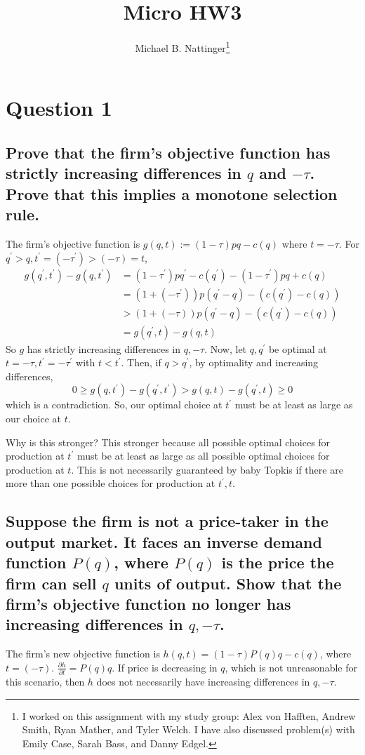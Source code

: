 \documentclass[11pt]{article} %
\title{Micro HW3}
\author{Michael B. Nattinger\footnote{I worked on this assignment with my study group: Alex von Hafften, Andrew Smith, Ryan Mather, and Tyler Welch. I have also discussed problem(s) with Emily Case, Sarah Bass, and Danny Edgel.}}
\begin{document}
\maketitle

\section{Question 1}
\subsection{Prove that the firm's objective function has strictly increasing differences in $q$ and $-\tau$. Prove that this implies a monotone selection rule.}
The firm's objective function is $g(q,t):= (1-\tau)pq - c(q)$ where $t = -\tau$. For $q^{'}>q,t^{'} = (-\tau^{'})>(-\tau) = t$,
\begin{align*}
g(q^{'},t^{'}) - g(q,t^{'}) &=  (1-\tau^{'})pq^{'} - c(q^{'}) - (1-\tau^{'})pq + c(q)\\
&=   (1+(-\tau^{'}))p(q^{'} - q) - (c(q^{'}) -c(q))\\
&> (1+(-\tau))p(q^{'} - q) - (c(q^{'}) -c(q))\\
&= g(q^{'},t) - g(q,t)
\end{align*}
So $g$ has strictly increasing differences in $q,-\tau$. Now, let $q,q^{'}$ be optimal at $t = -\tau,t^{'} = -\tau^{'}$ with $t<t^{'}$. Then, if $q>q^{'}$, by optimality and increasing differences,
\begin{equation*}
0 \geq g(q,t^{'}) - g(q^{'},t^{'})> g(q,t) - g(q^{'},t) \geq 0
\end{equation*}
which is a contradiction. So, our optimal choice at $t^{'}$ must be at least as large as our choice at $t$.

Why is this stronger? This stronger because all possible optimal choices for production at $t^{'}$ must be at least as large as all possible optimal choices for production at $t$.  This is not necessarily guaranteed by baby Topkis if there are more than one possible choices for production at $t^{'},t$.
\subsection{Suppose the firm is not a price-taker in the output market. It faces an inverse demand function $P(q)$, where $P(q)$ is the price the firm can sell $q$ units of output. Show that the firm's objective function no longer has increasing differences in $q,-\tau$.}
The firm's new objective function is $h(q,t) = (1-\tau)P(q)q - c(q)$, where $t=(-\tau)$. $\frac{\partial h}{\partial t} = P(q)q$. If price is decreasing in $q$, which is not unreasonable for this scenario, then $h$ does not necessarily have increasing differences in $q,-\tau$.
\end{document}
